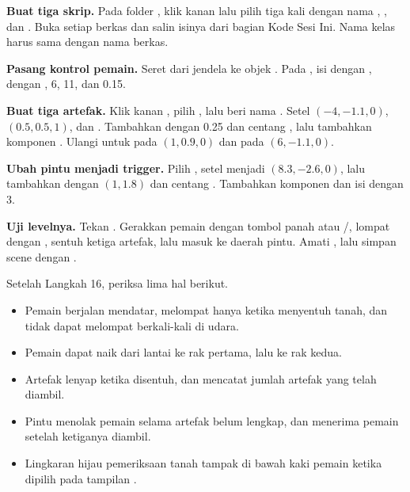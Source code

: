 \begin{langkah}
  \item \textbf{Buat tiga skrip.} Pada folder , klik
        kanan lalu pilih  tiga kali dengan nama
        , , dan . Buka setiap
        berkas dan salin isinya dari bagian Kode Sesi Ini. Nama kelas harus
        sama dengan nama berkas.

  \item \textbf{Pasang kontrol pemain.} Seret  dari
        jendela  ke objek . Pada
        , isi  dengan ,
         dengan ,  6,
         11, dan  0.15.

  \item \textbf{Buat tiga artefak.} Klik kanan , pilih
        , lalu beri nama
        . Setel  $(-4,-1.1,0)$, 
        $(0.5,0.5,1)$, dan  . Tambahkan
         dengan  0.25 dan centang
        , lalu tambahkan komponen . Ulangi
        untuk  pada $(1,0.9,0)$ dan  pada
        $(6,-1.1,0)$.

  \item \textbf{Ubah pintu menjadi trigger.} Pilih , setel
         menjadi $(8.3,-2.6,0)$, lalu tambahkan
         dengan  $(1,1.8)$ dan centang
        . Tambahkan komponen  dan isi
         dengan 3.

  \item \textbf{Uji levelnya.} Tekan . Gerakkan pemain dengan
        tombol panah atau /, lompat dengan ,
        sentuh ketiga artefak, lalu masuk ke daerah pintu. Amati
        , lalu simpan scene dengan .
\end{langkah}

\begin{ujibox}
Setelah Langkah 16, periksa lima hal berikut.
\begin{itemize}[leftmargin=1.4em, itemsep=0.2em]
  \item Pemain berjalan mendatar, melompat hanya ketika menyentuh tanah, dan
        tidak dapat melompat berkali-kali di udara.
  \item Pemain dapat naik dari lantai ke rak pertama, lalu ke rak kedua.
  \item Artefak lenyap ketika disentuh, dan  mencatat jumlah
        artefak yang telah diambil.
  \item Pintu menolak pemain selama artefak belum lengkap, dan menerima
        pemain setelah ketiganya diambil.
  \item Lingkaran hijau pemeriksaan tanah tampak di bawah kaki pemain ketika
         dipilih pada tampilan .
\end{itemize}
\end{ujibox}

